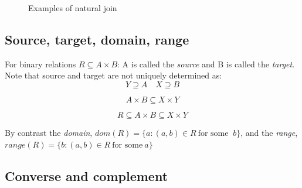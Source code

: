 \documentclass[12pt]{article} %
\begin{document}
\begin{figure}[H]
\caption{Examples of natural join}
\label{Natural join example}
\end{figure}

\subsection{Source, target, domain, range}
For binary relations $R \subseteq A \times B$: A is called the \textit{source} and B is called the \textit{target}. Note that source and target are not uniquely determined as:
\[
    Y \supseteq A \quad X \supseteq B
\]

\[
    A \times B \subseteq X \times Y 
\]

\[
    R \subseteq A \times B \subseteq X \times Y
\]

By contrast the \textit{domain}, $dom(R) = \{a : (a,b) \in R \ \textrm{for some } \ b\}$, and the \textit{range}, $range(R) = \{b : (a,b) \in R \ \textrm{for some} \ a\}$


\subsection{Converse and complement}
\end{document}
